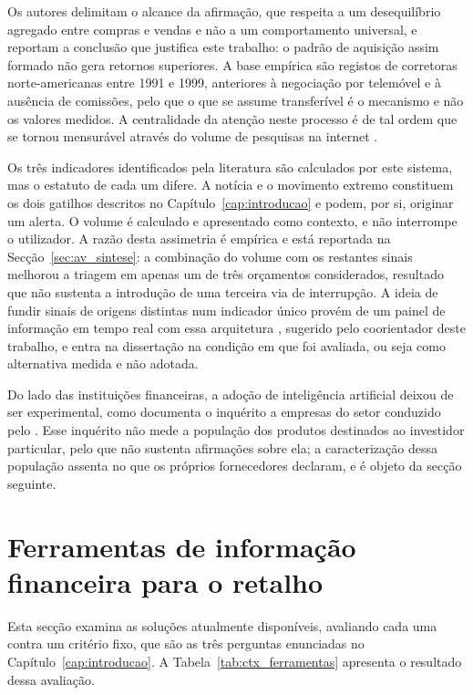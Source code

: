 Os autores delimitam o
alcance da afirmação, que respeita a um desequilíbrio agregado entre compras e vendas e não a um
comportamento universal, e reportam a conclusão que justifica este trabalho: o padrão de aquisição
assim formado não gera retornos superiores. A base empírica são registos de corretoras
norte-americanas entre 1991 e 1999, anteriores à negociação por telemóvel e à ausência de
comissões, pelo que o que se assume transferível é o mecanismo e não os valores medidos. A
centralidade da atenção neste processo é de tal ordem que se tornou mensurável através do volume de
pesquisas na internet \autocite{da2011attention}.

Os três indicadores identificados pela literatura são calculados por este sistema, mas o estatuto
de cada um difere. A notícia e o movimento extremo constituem os dois gatilhos descritos no
Capítulo~\ref{cap:introducao} e podem, por si, originar um alerta. O volume é calculado e
apresentado como contexto, e não interrompe o utilizador. A razão desta assimetria é empírica e
está reportada na Secção~\ref{sec:av_sintese}: a combinação do volume com os restantes sinais
melhorou a triagem em apenas um de três orçamentos considerados, resultado que não sustenta a
introdução de uma terceira via de interrupção. A ideia de fundir sinais de origens distintas num
indicador único provém de um painel de informação em tempo real com essa arquitetura
\autocite{worldmonitor2026}, sugerido pelo coorientador deste trabalho, e entra na dissertação na
condição em que foi avaliada, ou seja como alternativa medida e não adotada.

Do lado das instituições financeiras, a adoção de inteligência artificial deixou de ser
experimental, como documenta o inquérito a empresas do setor conduzido pelo
\textcite{ccaf2026aifs}. Esse inquérito não mede a população dos produtos destinados ao investidor
particular, pelo que não sustenta afirmações sobre ela; a caracterização dessa população assenta no
que os próprios fornecedores declaram, e é objeto da secção seguinte.

\section{Ferramentas de informação financeira para o retalho}
\label{sec:ctx_ferramentas}

Esta secção examina as soluções atualmente disponíveis, avaliando cada uma contra um critério fixo,
que são as três perguntas enunciadas no Capítulo~\ref{cap:introducao}. A
Tabela~\ref{tab:ctx_ferramentas} apresenta o resultado dessa avaliação.


